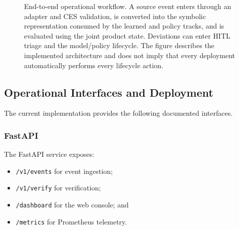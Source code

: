 \documentclass[11pt,a4paper]{article}
\begin{document}
\begin{landscape}
\begin{figure}[p]
{%
}

\caption{End-to-end operational workflow. A source event enters through an adapter and
CES validation, is converted into the symbolic representation consumed by the learned
and policy tracks, and is evaluated using the joint product state. Deviations can enter
HITL triage and the model/policy lifecycle. The figure describes the implemented
architecture and does not imply that every deployment automatically performs every
lifecycle action.}
\label{fig:swimlane}

\end{figure}
\end{landscape}

\subsection{Operational Interfaces and Deployment}

The current implementation provides the following documented interfaces.

\subsubsection*{FastAPI}

The FastAPI service exposes:

\begin{itemize}
\item \texttt{/v1/events} for event ingestion;
\item \texttt{/v1/verify} for verification;
\item \texttt{/dashboard} for the web console; and
\item \texttt{/metrics} for Prometheus telemetry.
\end{itemize}
\end{document}
